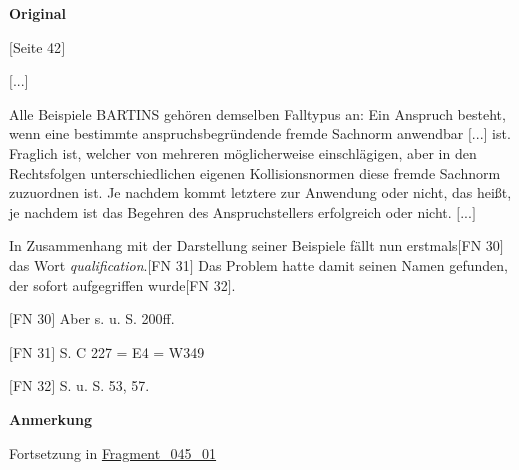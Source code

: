 \documentclass[ngerman,final,fontsize=12pt,paper=a4,twoside,bibliography=totocnumbered,BCOR=8mm,draft=false]{scrartcl}
\newenvironment{fragment}
	{\begin{snugshade}}
	{\end{snugshade}
	 \penalty-200
	 \vskip 0pt plus 10mm minus 5mm}
\newenvironment{fragmentpart}[1]
	{\noindent\textbf{#1}\par\penalty500}
	{\par}
\begin{document}
\begin{fragment}
\begin{fragmentpart}{Original \cite[S.~41--42 Z.~24--26,~111--113,~42--4,~7--11,~15--17,~120--122]{Weber-1986}}
{$[$Seite 42$]$

$[$...$]$ 

Alle Beispiele BARTINS gehören demselben Falltypus an: Ein Anspruch besteht, wenn eine bestimmte anspruchsbegründende fremde Sachnorm anwendbar $[$...$]$ ist. Fraglich ist, welcher von mehreren möglicherweise einschlägigen, aber in den Rechtsfolgen unterschiedlichen eigenen Kollisionsnormen diese fremde Sachnorm zuzuordnen ist. Je nachdem kommt letztere zur Anwendung oder nicht, das heißt, je nachdem ist das Begehren des Anspruchstellers erfolgreich oder nicht. $[$...$]$

In Zusammenhang mit der Darstellung seiner Beispiele fällt nun erstmals$[$FN 30$]$ das Wort \textsl{qualification}.$[$FN 31$]$ Das Problem hatte damit seinen Namen gefunden, der sofort aufgegriffen wurde$[$FN 32$]$.


$[$FN 30$]$ Aber s. u. S. 200ff.

$[$FN 31$]$ S. C 227 = E4 = W349

$[$FN 32$]$ S. u. S. 53, 57.}
\end{fragmentpart}
\begin{fragmentpart}{Anmerkung}
Fortsetzung in \hyperlink{Lm-Fragment-045-01}{Fragment\_045\_01}
\end{fragmentpart}
\end{fragment}
\hypertarget{Lm-Fragment-045-01}{}
\end{document}
